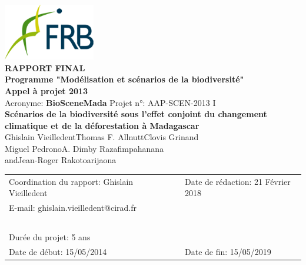 \renewcommand{\bibsection}{}
\begin{center}
\includegraphics[width=4cm]{figures/FRB.png}\\
\vspace{1cm}
{\large
  \textbf{
    RAPPORT FINAL\\
    Programme "Modélisation et scénarios de la biodiversité"\\
    Appel à projet 2013\\
  }
}
\vspace{1cm}
Acronyme: \textbf{BioSceneMada} \hspace{2cm} Projet n°: AAP-SCEN-2013 I\\
\vspace{1cm}
{\Large \textbf{Scénarios de la biodiversité sous l'effet conjoint du changement climatique et de la déforestation à Madagascar}}\\
\vspace{1cm}
{\large 
  Ghislain Vieilledent\hspace{1cm}Thomas F. Allnutt\hspace{1cm}Clovis Grinand\\
  \vspace{0.25cm}
  Miguel Pedrono\hspace{1cm}A. Dimby Razafimpahanana\\
  \vspace{0.25cm}
  and\hspace{1cm}Jean-Roger Rakotoarijaona\\
}
\vspace{1cm}
\begin{tabular}{lcl}
Coordination du rapport: Ghislain Vieilledent & \hspace{1cm} & Date de rédaction: 21 Février 2018\\
E-mail: ghislain.vieilledent@cirad.fr & \hspace{1cm} & ~ \\ 
~ & ~ \\
Durée du projet: 5 ans & \hspace{1cm} & ~ \\
Date de début: 15/05/2014 & \hspace{1cm} & Date de fin: 15/05/2019\\
\end{tabular}
\end{center}
\newpage